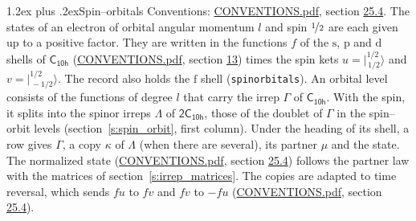 \documentclass[10pt,a4paper]{article}
\makeatletter
\renewcommand\section{\@startsection{section}{1}{\z@}{-3ex plus -1ex minus -.2ex}%
  {1.2ex plus .2ex}{\normalfont\large\sffamily\bfseries\color{parttitle}}}
\numberwithin{equation}{section}
\newcommand{\grp}[1]{\mathsf{#1}}
\newcommand{\orbital}[1]{\mathrm{#1}}
\newcommand{\mult}{\kappa}
\newcommand{\intx}{\mu}
\newcommand{\jm}[2]{\bigl\lvert{}^{#1}_{\,#2}\bigr\rangle}
\makeatother
\begin{document}
\section{Spin--orbitals}\label{s:spin_orbitals}
Conventions: \href{../../CONVENTIONS.pdf}{CONVENTIONS.pdf}, section \href{../../CONVENTIONS.pdf\#conv.25.4}{25.4}.
\leavevmode\label{n:index.orbital.l}The states of an electron of orbital angular momentum $l$ and spin $\nicefrac{1}{2}$ are each given up to a positive factor. \label{n:local.spinor.uv}\label{n:local.function.f}They are written in the functions $f$ of the $\orbital{s}$, $\orbital{p}$ and $\orbital{d}$ shells of \href{../../../rotation/data/pdf/C10h.pdf}{$\grp{C_{10h}}$} (\href{../../CONVENTIONS.pdf}{CONVENTIONS.pdf}, section \href{../../../rotation/CONVENTIONS.pdf\#conv.13}{13}) times the spin kets $u = \jm{1/2}{1/2}$ and $v = \jm{1/2}{-1/2}$. The record also holds the $\orbital{f}$ shell (\texttt{spinorbitals}). An orbital level consists of the functions of degree $l$ that carry the irrep $\Gamma$ of \href{../../../rotation/data/pdf/C10h.pdf}{$\grp{C_{10h}}$}. With the spin, it splits into the spinor irreps $\Lambda$ of $\grp{2C_{10h}}$, those of the doublet of $\Gamma$ in the spin--orbit levels (section~\ref{s:spin_orbit}, first column). \label{n:head.state}Under the heading of its shell, a row gives $\Gamma$, a copy $\mult$ of $\Lambda$ (when there are several), its partner $\intx$ and the state. The normalized state (\href{../../CONVENTIONS.pdf}{CONVENTIONS.pdf}, section \href{../../CONVENTIONS.pdf\#conv.25.4}{25.4}) follows the partner law with the matrices of section~\ref{s:irrep_matrices}. The copies are adapted to time reversal, which sends $f u$ to $f v$ and $f v$ to $-f u$ (\href{../../CONVENTIONS.pdf}{CONVENTIONS.pdf}, section \href{../../CONVENTIONS.pdf\#conv.25.4}{25.4}).
\end{document}
